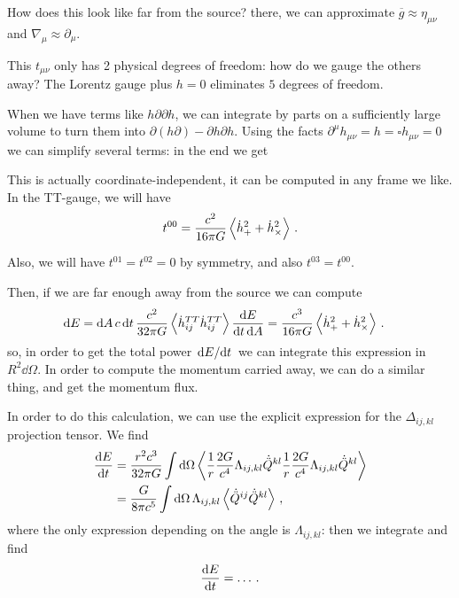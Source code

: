 \documentclass[main.tex]{subfiles}
\begin{document}
How does this look like far from the source? there, we can approximate \(\overline{g} \approx \eta_{\mu \nu }\) and \(\nabla_{\mu } \approx \partial_{\mu }\). 

This \(t_{\mu \nu }\) only has 2 physical degrees of freedom: how do we gauge the others away? The Lorentz gauge plus \(h=0\) eliminates \(5\) degrees of freedom. 

When we have terms like \(h \partial \partial h\), we can integrate by parts on a sufficiently large volume to turn them into \(\partial(h \partial ) - \partial h \partial h\). 
Using the facts \(\partial^{\mu }h_{\mu \nu } = h = \square h_{\mu \nu } = 0\) we can simplify several terms: in the end we get 
%

This is actually coordinate-independent, it can be computed in any frame we like. In the TT-gauge, we will have 
%
\begin{align}
t^{00 }= \frac{c^2}{16 \pi G} \expval{\dot{h}^2_{+} + \dot{h}^2_{ \times }}
\,.
\end{align}

Also, we will have \(t^{01} = t^{02} =0 \) by symmetry, and also \(t^{03}= t^{00}\). 

Then, if we are far enough away from the source we can compute 
%
\begin{align}
\dd{E} &= \dd{A} c \dd{t} \frac{c^2}{32 \pi G} \expval{\dot{h}^{TT}_{ij}\dot{h}^{TT}_{ij}}
\frac{ \dd{E}}{ \dd{t} \dd{A}} = \frac{c^3}{16 \pi G} \expval{\dot{h}^2_{+} + \dot{h}^2_{ \times }}
\,.
\end{align}
%
so, in order to get the total power \(\dv*{E}{t}\) we can integrate this expression in \(R^2 \dd{\Omega }\). 
In order to compute the momentum carried away, we can do a similar thing, and get the momentum flux. 

In order to do this calculation, we can use the explicit expression for the \(\Delta_{ij,kl}\) projection tensor. We find 
%
\begin{align}
\dv{E}{t} &= \frac{r^2c^{3}}{32 \pi G} \int \dd{\Omega }
\expval{
\frac{1}{r} \frac{2G}{c^{4}} \Lambda_{ij,kl} \dot{\ddot{Q}}^{kl}
\frac{1}{r} \frac{2G}{c^{4}} \Lambda_{ij,kl} \dot{\ddot{Q}}^{kl}
}  \\
&=\frac{G}{8 \pi c^{5}} \int \dd{\Omega }
\Lambda_{ij, kl} \expval{\dot{\ddot{Q}}^{ij} \dot{\ddot{Q}}^{kl}}
\,,
\end{align}
%
where the only expression depending on the angle is \(\Lambda_{ij, kl} \): then we integrate and find 
%
\begin{align}
\dv{E}{t} = \dots
\,.
\end{align}
\end{document}
